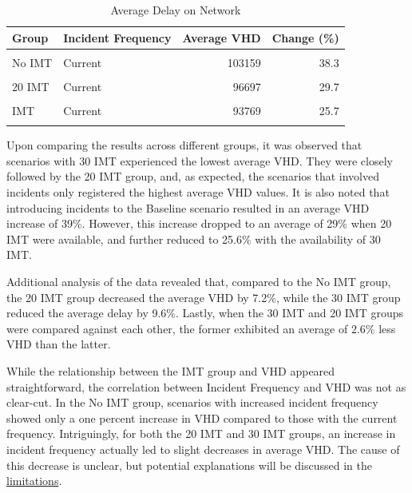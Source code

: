 \documentclass[fancy, oneside, mastersfancy, ms]{byuthesis}
\begin{document}
\hypertarget{tbl-network-delays-table}{}
\begin{table}
\caption{\label{tbl-network-delays-table}Average Delay on Network }\tabularnewline

\centering
\begin{tabular}[t]{llrr}
\toprule
\textbf{Group} & \textbf{Incident Frequency} & \textbf{Average VHD} & \textbf{Change (\%)}\\
\midrule
\cellcolor{gray!6}{Baseline} & \cellcolor{gray!6}{-} & \cellcolor{gray!6}{74568} & \cellcolor{gray!6}{0.0}\\
No IMT & Current & 103159 & 38.3\\
\cellcolor{gray!6}{No IMT} & \cellcolor{gray!6}{Increased} & \cellcolor{gray!6}{104178} & \cellcolor{gray!6}{39.7}\\
20 IMT & Current & 96697 & 29.7\\
\cellcolor{gray!6}{20 IMT} & \cellcolor{gray!6}{Increased} & \cellcolor{gray!6}{95678} & \cellcolor{gray!6}{28.3}\\
\addlinespace
30 IMT & Current & 93769 & 25.7\\
\cellcolor{gray!6}{30 IMT} & \cellcolor{gray!6}{Increased} & \cellcolor{gray!6}{93560} & \cellcolor{gray!6}{25.5}\\
\bottomrule
\end{tabular}
\end{table}

Upon comparing the results across different groups, it was observed that
scenarios with 30 IMT experienced the lowest average VHD. They were
closely followed by the 20 IMT group, and, as expected, the scenarios
that involved incidents only registered the highest average VHD values.
It is also noted that introducing incidents to the Baseline scenario
resulted in an average VHD increase of 39\%. However, this increase
dropped to an average of 29\% when 20 IMT were available, and further
reduced to 25.6\% with the availability of 30 IMT.

Additional analysis of the data revealed that, compared to the No IMT
group, the 20 IMT group decreased the average VHD by 7.2\%, while the 30
IMT group reduced the average delay by 9.6\%. Lastly, when the 30 IMT
and 20 IMT groups were compared against each other, the former exhibited
an average of 2.6\% less VHD than the latter.

While the relationship between the IMT group and VHD appeared
straightforward, the correlation between Incident Frequency and VHD was
not as clear-cut. In the No IMT group, scenarios with increased incident
frequency showed only a one percent increase in VHD compared to those
with the current frequency. Intriguingly, for both the 20 IMT and 30 IMT
groups, an increase in incident frequency actually led to slight
decreases in average VHD. The cause of this decrease is unclear, but
potential explanations will be discussed in the
\protect\hyperlink{sec-limitations}{limitations}.
\end{document}
